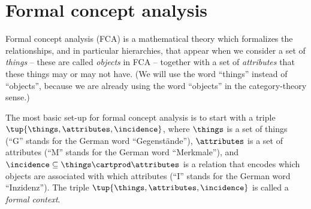 

\section{Formal concept analysis}

Formal concept analysis (FCA) is a mathematical theory which formalizes the relationships, and in particular hierarchies, that appear when we consider a set of \emph{things} -- these are called \emph{objects} in FCA -- together with a set of \emph{attributes} that these things may or may not have.
(We will use the word ``things'' instead of ``objects'', because we are already using the word ``objects'' in the category-theory sense.)

The most basic set-up for formal concept analysis is to start with a triple $\tup{\things, \attributes, \incidence}$, where $\things$ is a set of things (``G'' stands for the German word ``Gegenst\"ande''), $\attributes$ is a set of attributes (``M'' stands for the German word ``Merkmale''), and $\incidence \subseteq \things \cartprod \attributes$ is a relation that encodes which objects are associated with which attributes (``I'' stands for the German word ``Inzidenz'').
The triple $\tup{\things, \attributes, \incidence}$ is called a \emph{formal context}.

